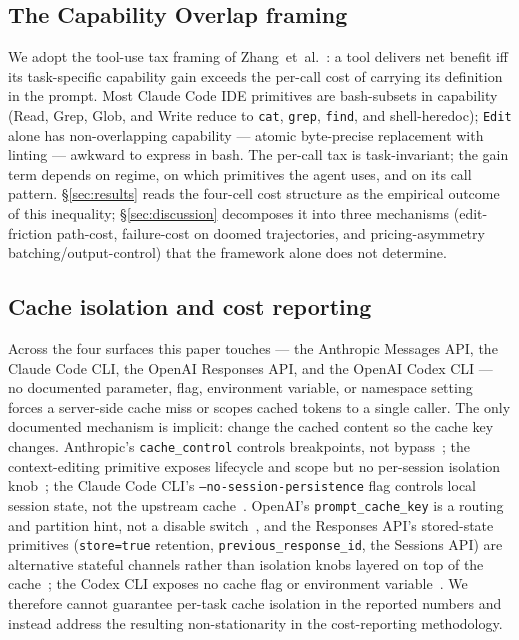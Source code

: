 \subsection{The Capability Overlap framing}
\label{sec:method-capability}

We adopt the tool-use tax framing of
Zhang~et~al.~\cite{zhang2026tooltax}: a tool delivers net benefit iff
its task-specific capability gain exceeds the per-call cost of
carrying its definition in the prompt. Most Claude Code IDE primitives
are bash-subsets in capability (Read, Grep, Glob, and Write reduce to
\texttt{cat}, \texttt{grep}, \texttt{find}, and shell-heredoc);
\texttt{Edit} alone has non-overlapping capability --- atomic
byte-precise replacement with linting --- awkward to express in bash.
The per-call tax is task-invariant; the gain term depends on regime, on
which primitives the agent uses, and on its call pattern.
§\ref{sec:results} reads the four-cell cost structure as the empirical
outcome of this inequality; §\ref{sec:discussion} decomposes it into
three mechanisms (edit-friction path-cost, failure-cost on doomed
trajectories, and pricing-asymmetry batching/output-control) that the
framework alone does not determine.

\subsection{Cache isolation and cost reporting}
\label{sec:m-cost}
\label{sec:method-cost}

Across the four surfaces this paper touches --- the Anthropic
Messages API, the Claude Code CLI, the OpenAI Responses API, and the
OpenAI Codex CLI --- no documented parameter, flag, environment
variable, or namespace setting forces a server-side cache miss or scopes
cached tokens to a single caller. The only documented mechanism is
implicit: change the cached content so the cache key changes.
Anthropic's \texttt{cache\_control} controls breakpoints, not
bypass~\cite{docs:anthropic2026promptcaching}; the context-editing
primitive exposes lifecycle and scope but no per-session isolation
knob~\cite{docs:anthropic2026contextediting}; the Claude Code CLI's
\texttt{--no-\allowbreak session-\allowbreak persistence} flag controls local session state,
not the upstream
cache~\cite{docs:claudecode2026cli,docs:claudecode2026settings}.
OpenAI's \texttt{prompt\allowbreak\_cache\allowbreak\_key} is a routing and partition hint,
not a disable
switch~\cite{docs:openai2026promptcaching}, and the Responses API's
stored-state primitives (\texttt{store=true} retention,
\texttt{previous\allowbreak\_response\allowbreak\_id}, the Sessions API) are alternative
stateful channels rather than isolation knobs layered on top of the
cache~\cite{docs:openai2026convstate}; the Codex CLI exposes no cache
flag or environment variable~\cite{repo:openai2026codex}. We
therefore cannot guarantee per-task cache isolation in the reported
numbers and instead address the resulting non-stationarity in the
cost-reporting methodology.

